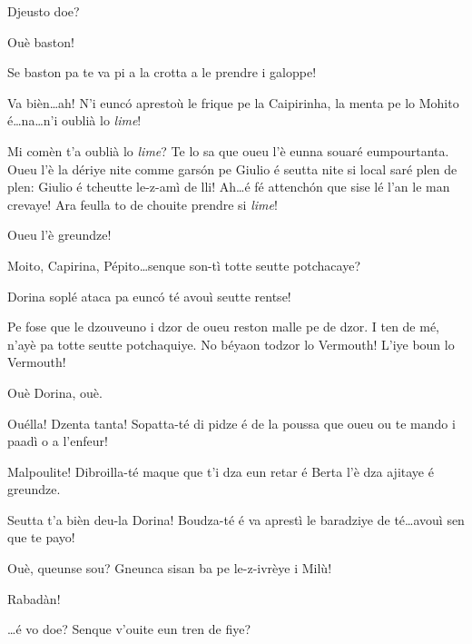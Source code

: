 \begin{drama}
\Bertaspeaks Djeusto doe?

\Helenespeaks Ouè baston!

\Bertaspeaks Se baston pa te va pi a la crotta a le prendre i galoppe!

\Helenespeaks Va bièn\ldots ah! N'i eunc\'o aprestoù le frique pe la Caipirinha, la menta pe lo Mohito é\ldots na\ldots n'i oublià lo \textit{lime}!

\Bertaspeaks{} Mi comèn t'a oublià lo \textit{lime}? Te lo sa que oueu l'è eunna souaré eumpourtanta. Oueu l'è la dériye nite comme gars\'on pe Giulio é seutta nite si local saré plen de plen: Giulio é tcheutte le-z-amì de lli! Ah\ldots é fé attench\'on que sise lé l'an le man crevaye! Ara feulla to de chouite prendre si \textit{lime}!


\Dorinaspeaks{} Oueu l'è greundze!

\Dorinaspeaks{} Moito, Capirina, Pépito\ldots senque son-tì totte seutte potchacaye?

\Bertaspeaks Dorina soplé ataca pa eunc\'o té avouì seutte rentse!

\Dorinaspeaks Pe fose que le dzouveuno i dzor de oueu reston malle pe de dzor.  I ten de mé, n'ayè pa totte seutte po\-tchaquiye. No béyaon todzor lo Vermouth! L'iye boun lo Vermouth!


\Bertaspeaks{} Ouè Dorina, ouè.


\Djspeaks {} Ouélla! Dzenta tanta! Sopatta-té di pidze é de la poussa que oueu ou te mando i paadì o a l'enfeur!

\Dorinaspeaks Malpoulite! Dibroilla-té maque que t'i dza eun retar é Ber\-ta l’è dza ajitaye é greundze.

\Bertaspeaks Seutta t'a bièn deu-la Dorina!   Boudza-té é va aprestì le baradziye de té\ldots avouì sen que te payo!

\Djspeaks Ouè, queunse sou? Gneunca sisan ba pe le-z-ivrèye i Milù!

\Bertaspeaks Rabadàn!

\Bertaspeaks{} \ldots é vo doe? Senque v'ouite eun tren de fiye?


\end{drama}
